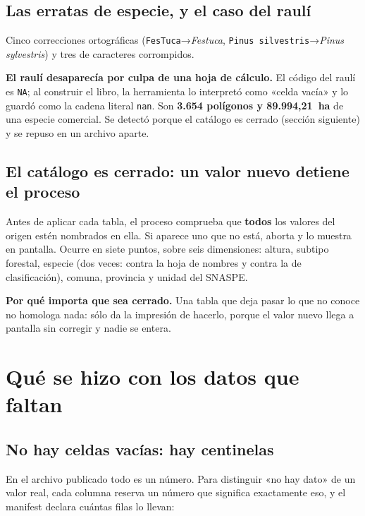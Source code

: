 \documentclass[11pt,a4paper]{report}
\newcommand{\campo}[1]{\textcolor{conaf}{\textbf{#1}}}
\newcommand{\orig}[1]{\texttt{\small #1}}
\begin{document}
\section{Las erratas de especie, y el caso del raulí}

Cinco correcciones ortográficas (\orig{FesTuca}→\emph{Festuca},
\orig{Pinus silvestris}→\emph{Pinus sylvestris}) y tres de caracteres
corrompidos.

\begin{alerta}
\campo{El raulí desaparecía por culpa de una hoja de cálculo.} El código del
raulí es \orig{NA}; al construir el libro, la herramienta lo interpretó como
«celda vacía» y lo guardó como la cadena literal \orig{nan}. Son
\textbf{3.654 polígonos y 89.994,21~ha} de una especie comercial. Se detectó
porque el catálogo es cerrado (sección siguiente) y se repuso en un archivo
aparte.
\end{alerta}

\section{El catálogo es cerrado: un valor nuevo detiene el proceso}

Antes de aplicar cada tabla, el proceso comprueba que \campo{todos} los valores
del origen estén nombrados en ella. Si aparece uno que no está, aborta y lo
muestra en pantalla. Ocurre en siete puntos, sobre seis dimensiones: altura,
subtipo forestal, especie (dos veces: contra la hoja de nombres y contra la de
clasificación), comuna, provincia y unidad del SNASPE.

\begin{nota}
\campo{Por qué importa que sea cerrado.} Una tabla que deja pasar lo que no
conoce no homologa nada: sólo da la impresión de hacerlo, porque el valor nuevo
llega a pantalla sin corregir y nadie se entera.
\end{nota}

\chapter{Qué se hizo con los datos que faltan}

\section{No hay celdas vacías: hay centinelas}

En el archivo publicado todo es un número. Para distinguir «no hay dato» de un
valor real, cada columna reserva un número que significa exactamente eso, y el
manifest declara cuántas filas lo llevan:
\end{document}
